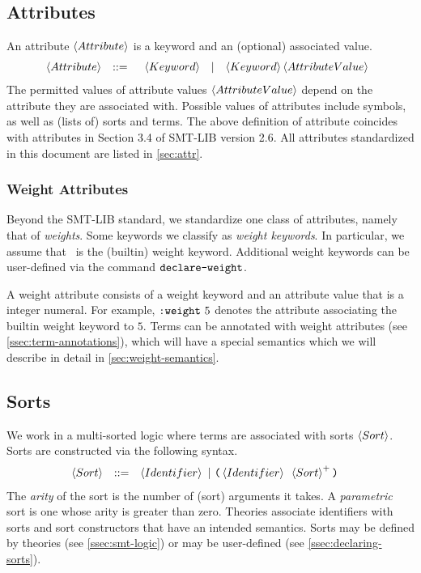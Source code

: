 \documentclass[english,a4paper,10pt]{article}
\begin{document}
\subsection{Attributes}

An attribute $\left\langle Attribute\right\rangle$
is a keyword and an (optional) associated value.
\[
\begin{array}{rcl}
\left\langle Attribute\right\rangle & ::= & \begin{array}{ccc}
\left\langle Keyword\right\rangle & | & \left\langle Keyword\right\rangle \left\langle AttributeValue\right\rangle
\end{array}\\
\end{array}
\]
The permitted values of attribute values $\left\langle AttributeValue\right\rangle$ depend on the attribute
they are associated with.
Possible values of attributes include symbols, as well as (lists of) sorts and terms.
The above definition of attribute coincides with
attributes in Section 3.4 of SMT-LIB version 2.6.
All attributes standardized in this document are listed in \cref{sec:attr}.

\subsubsection{Weight Attributes}
\label{sec:weight-attributes}
Beyond the SMT-LIB standard, we standardize one class of attributes, namely that of \emph{weights}.
Some keywords we classify as \emph{weight keywords}.
In particular, we assume that \kweight\ is the (builtin) weight keyword.
Additional weight keywords can be user-defined via the command $\texttt{declare-weight}$.

A weight attribute consists of a weight keyword and an attribute value that is a integer numeral.
For example, $\texttt{:weight}\mbox{ }5$ denotes the attribute associating the builtin weight keyword to $5$.
Terms can be annotated with weight attributes (see \cref{ssec:term-annotations}),
which will have a special semantics which we will describe in detail in \cref{sec:weight-semantics}.

\subsection{Sorts}

We work in a multi-sorted logic where terms 
are associated with sorts $\left\langle Sort\right\rangle$.
Sorts are constructed via the following syntax.
\begin{alignat*}{1}
 & \begin{array}{rcl}
\left\langle Sort\right\rangle & ::= & \left\langle Identifier\right\rangle\mbox{ }|\mbox{ }\texttt{(}\left\langle Identifier\right\rangle\mbox{ }\left\langle Sort\right\rangle^{+}\texttt{)}\\
\end{array}
\end{alignat*}
The \emph{arity} of the sort is the number of (sort) arguments it takes.
A \emph{parametric} sort is one whose arity is greater than zero.
Theories associate identifiers with sorts and sort constructors
that have an intended semantics.
Sorts may be defined by theories (see \cref{ssec:smt-logic})
or may be user-defined
(see \cref{ssec:declaring-sorts}).
\end{document}
